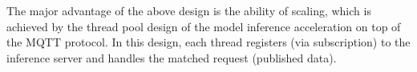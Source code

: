 \documentclass[conference]{IEEEtran}
\def\figurename{Figure}
\begin{document}
The major advantage of the above design is the ability of scaling, which is achieved by the thread pool design of the model inference acceleration on top of the MQTT protocol. In this design, each thread registers (via subscription) to the inference server and handles the matched request (published data).

%
\end{document}
